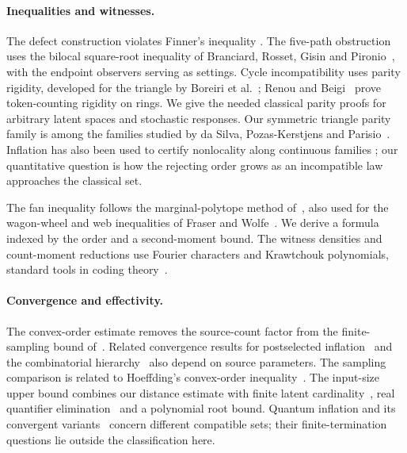 \documentclass[11pt]{article}
\theoremstyle{plain}
\theoremstyle{definition}
\begin{document}
\paragraph{Inequalities and witnesses.}
The defect construction violates Finner's inequality \cite{Finner1992,Renou2019}. The five-path obstruction uses the bilocal square-root inequality of Branciard, Rosset, Gisin and Pironio~\cite{BranciardRossetGisinPironio2012}, with the endpoint observers serving as settings. Cycle incompatibility uses parity rigidity, developed for the triangle by Boreiri et al.\ \cite{BoreiriEtAl2023,BoreiriEtAl2025}; Renou and Beigi~\cite{RenouBeigi2022PRA} prove token-counting rigidity on rings. We give the needed classical parity proofs for arbitrary latent spaces and stochastic responses. Our symmetric triangle parity family is among the families studied by da Silva, Pozas-Kerstjens and Parisio~\cite{daSilvaPozasKerstjensParisio2025}. Inflation has also been used to certify nonlocality along continuous families \cite{PozasKerstjensGisinRenou2023}; our quantitative question is how the rejecting order grows as an incompatible law approaches the classical set.

The fan inequality follows the marginal-polytope method of~\cite[Section IV.D]{WSF2019}, also used for the wagon-wheel and web inequalities of Fraser and Wolfe~\cite{FraserWolfe2018}. We derive a formula indexed by the order and a second-moment bound. The witness densities and count-moment reductions use Fourier characters and Krawtchouk polynomials, standard tools in coding theory~\cite{MacWilliamsSloane1977}.

\paragraph{Convergence and effectivity.}
The convex-order estimate removes the source-count factor from the finite-sampling bound of~\cite{NW2020}. Related convergence results for postselected inflation~\cite{Gitton2022} and the combinatorial hierarchy~\cite{Fraser2020} also depend on source parameters. The sampling comparison is related to Hoeffding's convex-order inequality~\cite[Theorem 4]{Hoeffding1963}. The input-size upper bound combines our distance estimate with finite latent cardinality~\cite{RGW2018}, real quantifier elimination~\cite{BasuPollackRoy2006} and a polynomial root bound. Quantum inflation and its convergent variants~\cite{WolfeEtAl2021QuantumInflation,LigthartGachechiladzeGross2023} concern different compatible sets; their finite-termination questions lie outside the classification here.\par
\end{document}
